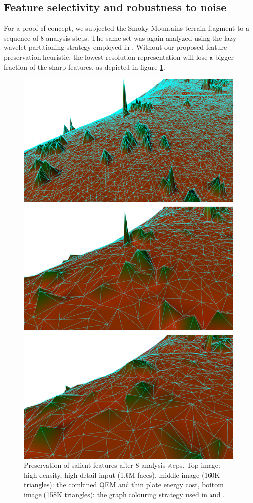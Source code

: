 \documentclass[graybox]{svmult}
\begin{document}
\subsection{Feature selectivity and robustness to noise}
For a proof of concept, we subjected the Smoky Mountains terrain fragment to a sequence of 8 analysis steps. The same set was again analyzed using the lazy-wavelet partitioning strategy employed in \cite{Wagner2005, Martinez2011}. Without our proposed feature preservation
heuristic, the lowest resolution representation will lose a bigger fraction of the sharp features, as depicted in figure \ref{fig_cds:sharpFeatures}.

\begin{figure}[!htbp]
	\centering
	\includegraphics[width=0.75\linewidth]{QEMvsNO.png}
	\caption{\label{fig_cds:sharpFeatures}
		Preservation of salient features after 8 analysis steps. Top image: high-density, high-detail input (1.6M faces), middle image (160K triangles): the combined QEM and thin plate energy cost, bottom image (158K triangles): the graph colouring strategy used in \cite{Wagner2005} and \cite{Martinez2011}. }
\end{figure}
\end{document}

